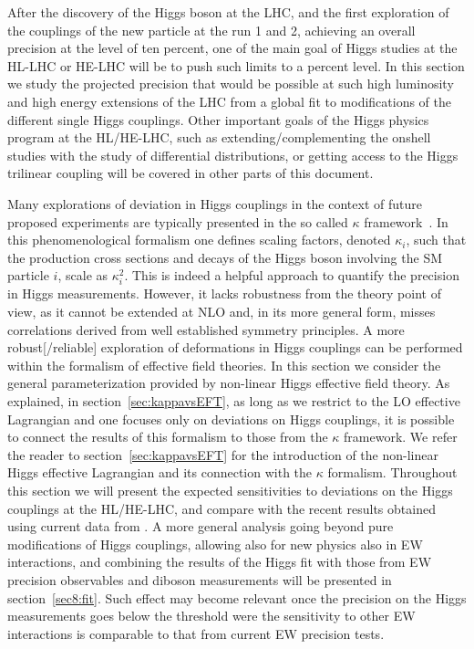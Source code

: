 After the discovery of the Higgs boson at the LHC, and the first exploration of the couplings of the new particle at the run 1 and 2, achieving an overall precision at the level of ten percent, one of the main goal of Higgs studies at the HL-LHC or HE-LHC will be to push such limits to a percent level. In this section we study the projected precision that would be possible at such high luminosity and high energy extensions of the LHC from a global fit to modifications of the different single Higgs couplings.
Other important goals of the Higgs physics program at the HL/HE-LHC, such as extending/complementing the onshell studies with the study of differential distributions, or getting access to the Higgs trilinear coupling will be covered in other parts of this document.

Many explorations of deviation in Higgs couplings in the context of future proposed experiments are typically presented in the so called $\kappa$ framework~\cite{LHCHiggsCrossSectionWorkingGroup:2012nn,Heinemeyer:2013tqa}. In this phenomenological formalism one defines scaling factors, denoted $\kappa_i$, such that the production cross sections and decays of the Higgs boson involving the SM particle $i$, scale as $\kappa_i^2$.
This is indeed a helpful approach to quantify the precision in Higgs measurements. However, it lacks robustness from the theory point of view, as it cannot be extended at NLO and, in its more general form, misses correlations derived from well established symmetry principles. A more robust[/reliable] exploration of deformations in Higgs couplings can be performed within the formalism of effective field theories. In this section we consider the general parameterization provided by non-linear Higgs effective field theory. As explained, in section~\ref{sec:kappavsEFT}, as long as we restrict to the LO effective Lagrangian and one focuses only on deviations on Higgs couplings, it is possible to connect the results of this formalism to those from the $\kappa$ framework.
We refer the reader to section~\ref{sec:kappavsEFT} for the introduction of the non-linear Higgs effective Lagrangian and its connection with the $\kappa$ formalism. Throughout this section we will present the expected sensitivities to deviations on the Higgs couplings at the HL/HE-LHC, and compare with the recent results obtained using current data from \cite{deBlas:2018tjm}. A more general analysis going beyond pure modifications of Higgs couplings, allowing also for new physics also in EW interactions, and combining the results of the Higgs fit with those from EW precision observables and diboson measurements will be presented in section~\ref{sec8:fit}. Such effect may become relevant once the precision on the Higgs measurements goes below the threshold were the sensitivity to other EW interactions is comparable to that from current EW precision tests.

